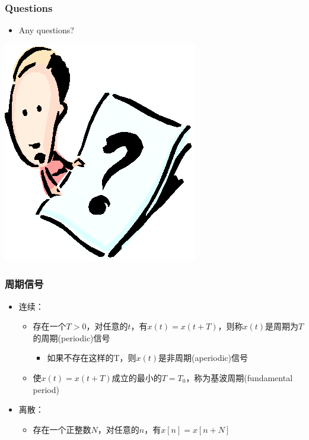 \documentclass[CJKutf8,xcolor=pdftex,dvipsnames,table]{beamer}
\begin{document}
\begin{CJK*}{UTF8}{song}
  \begin{frame}
    \frametitle{Questions}
    \begin{itemize}
    \item Any questions?
    \end{itemize}
    \begin{center}
      \includegraphics[scale=.5]{question}
    \end{center}
  \end{frame}
  
  \begin{frame}
    \frametitle{周期信号}
    \begin{itemize}
    \item 连续：
    \begin{itemize}
    \item 存在一个$T>0$，对任意的$t$，有$x(t)=x(t+T)$，则称$x(t)$是周期为$T$的周期(periodic)信号
    \begin{itemize}
    \item 如果不存在这样的T，则$x(t)$是非周期(aperiodic)信号
    \end{itemize}
    \item 使$x(t)=x(t+T)$成立的最小的$T=T_0$，称为基波周期(fundamental period)
    \end{itemize}
    \item 离散：
    \begin{itemize}
    \item 存在一个正整数$N$，对任意的$n$，有$x[n]=x[n+N]$
    \end{itemize}
    \end{itemize}
  \end{frame}  
  

\end{CJK*}
\end{document}
